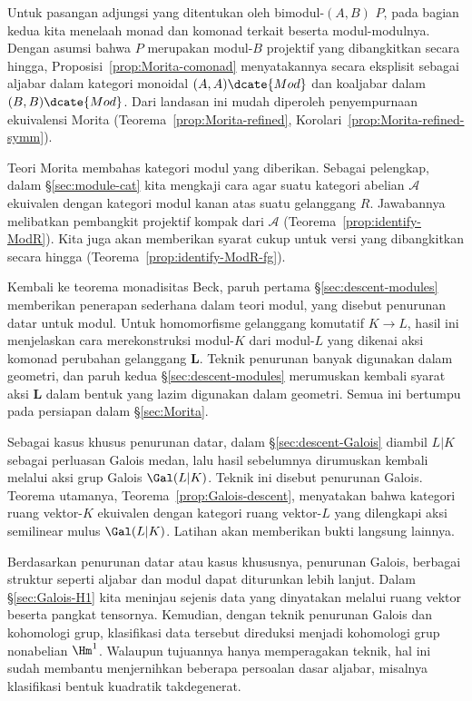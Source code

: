 Untuk pasangan adjungsi yang ditentukan oleh bimodul-$(A,B)$ $P$, pada bagian
kedua kita menelaah monad dan komonad terkait beserta modul-modulnya. Dengan
asumsi bahwa $P$ merupakan modul-$B$ projektif yang dibangkitkan secara hingga,
Proposisi~\ref{prop:Morita-comonad} menyatakannya secara eksplisit sebagai
aljabar dalam kategori monoidal $(A,A)\dcate{Mod}$ dan koaljabar dalam
$(B,B)\dcate{Mod}$. Dari landasan ini mudah diperoleh penyempurnaan ekuivalensi
Morita (Teorema~\ref{prop:Morita-refined},
Korolari~\ref{prop:Morita-refined-symm}).

Teori Morita membahas kategori modul yang diberikan. Sebagai pelengkap, dalam
\S\ref{sec:module-cat} kita mengkaji cara agar suatu kategori abelian
$\mathcal{A}$ ekuivalen dengan kategori modul kanan atas suatu gelanggang $R$.
Jawabannya melibatkan pembangkit projektif kompak dari $\mathcal{A}$
(Teorema~\ref{prop:identify-ModR}). Kita juga akan memberikan syarat cukup
untuk versi yang dibangkitkan secara hingga
(Teorema~\ref{prop:identify-ModR-fg}).

Kembali ke teorema monadisitas Beck, paruh pertama
\S\ref{sec:descent-modules} memberikan penerapan sederhana dalam teori modul,
yang disebut penurunan datar untuk modul. Untuk homomorfisme gelanggang
komutatif $K\to L$, hasil ini menjelaskan cara merekonstruksi modul-$K$ dari
modul-$L$ yang dikenai aksi komonad perubahan gelanggang $\mathbf{L}$. Teknik
penurunan banyak digunakan dalam geometri, dan paruh kedua
\S\ref{sec:descent-modules} merumuskan kembali syarat aksi $\mathbf{L}$ dalam
bentuk yang lazim digunakan dalam geometri. Semua ini bertumpu pada persiapan
dalam \S\ref{sec:Morita}.

Sebagai kasus khusus penurunan datar, dalam \S\ref{sec:descent-Galois} diambil
$L|K$ sebagai perluasan Galois medan, lalu hasil sebelumnya dirumuskan kembali
melalui aksi grup Galois $\Gal(L|K)$. Teknik ini disebut penurunan Galois.
Teorema utamanya, Teorema~\ref{prop:Galois-descent}, menyatakan bahwa kategori
ruang vektor-$K$ ekuivalen dengan kategori ruang vektor-$L$ yang dilengkapi
aksi semilinear mulus $\Gal(L|K)$. Latihan akan memberikan bukti langsung
lainnya.

Berdasarkan penurunan datar atau kasus khususnya, penurunan Galois, berbagai
struktur seperti aljabar dan modul dapat diturunkan lebih lanjut. Dalam
\S\ref{sec:Galois-H1} kita meninjau sejenis data yang dinyatakan melalui ruang
vektor beserta pangkat tensornya. Kemudian, dengan teknik penurunan Galois dan
kohomologi grup, klasifikasi data tersebut direduksi menjadi kohomologi grup
nonabelian $\Hm^1$. Walaupun tujuannya hanya memperagakan teknik, hal ini sudah
membantu menjernihkan beberapa persoalan dasar aljabar, misalnya klasifikasi
bentuk kuadratik takdegenerat.

